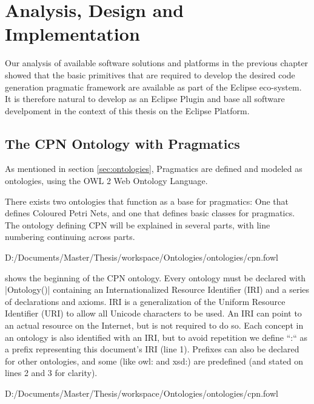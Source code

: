 \chapter{Analysis, Design and Implementation}
\label{chap:analysis}

Our analysis of available software solutions and platforms in the previous
chapter showed that the basic primitives that are required to develop the
desired code generation pragmatic framework are available as part of the Eclipse
eco-system. It is therefore natural to develop \thename{} as an Eclipse Plugin
and base all software develpoment in the context of this thesis on the Eclipse
Platform.

\section{The CPN Ontology with Pragmatics}

As mentioned in section \ref{sec:ontologies}, Pragmatics are defined and modeled
as ontologies, using the OWL 2 Web Ontology Language.  

There exists two ontologies that function as a base for pragmatics: One that
defines Coloured Petri Nets, and one that defines basic classes for pragmatics.
The ontology defining CPN will be explained in several parts, with line
numbering continuing across parts.


{D:/Documents/Master/Thesis/workspace/Ontologies/ontologies/cpn.fowl}

 shows the beginning of the CPN ontology. Every ontology must
be declared with |Ontology()| containing an Internationalized Resource
Identifier (IRI) and a series of declarations and axioms. IRI is a
generalization of the Uniform Resource Identifier (URI) to allow all Unicode
characters to be used. An IRI can point to an actual resource on the Internet,
but is not required to do so. Each concept in an ontology is also identified
with an IRI, but to avoid repetition we define ``:`` as a prefix representing
this document's IRI (line 1). Prefixes can also be declared for other
ontologies, and some (like owl: and xsd:) are predefined (and stated on lines 2
and 3 for clarity). 


{D:/Documents/Master/Thesis/workspace/Ontologies/ontologies/cpn.fowl} 

